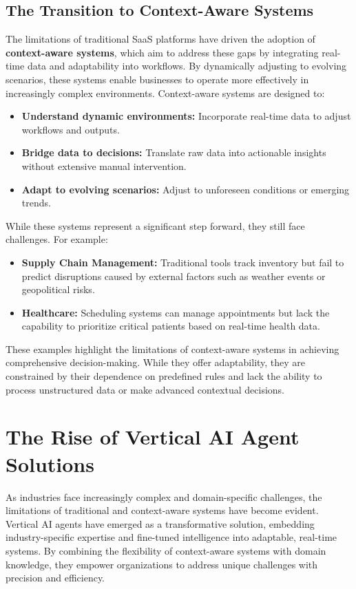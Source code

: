 \documentclass[12pt]{article}
\begin{document}
\subsection{The Transition to Context-Aware Systems}
The limitations of traditional SaaS platforms have driven the adoption of \textbf{context-aware systems}, which aim to address these gaps by integrating real-time data and adaptability into workflows. By dynamically adjusting to evolving scenarios, these systems enable businesses to operate more effectively in increasingly complex environments. Context-aware systems are designed to:
\begin{itemize}
    \item \textbf{Understand dynamic environments:} Incorporate real-time data to adjust workflows and outputs.
    \item \textbf{Bridge data to decisions:} Translate raw data into actionable insights without extensive manual intervention.
    \item \textbf{Adapt to evolving scenarios:} Adjust to unforeseen conditions or emerging trends.
\end{itemize}

While these systems represent a significant step forward, they still face challenges. For example:
\begin{itemize}
    \item \textbf{Supply Chain Management:} Traditional tools track inventory but fail to predict disruptions caused by external factors such as weather events or geopolitical risks.
    \item \textbf{Healthcare:} Scheduling systems can manage appointments but lack the capability to prioritize critical patients based on real-time health data.
\end{itemize}

These examples highlight the limitations of context-aware systems in achieving comprehensive decision-making. While they offer adaptability, they are constrained by their dependence on predefined rules and lack the ability to process unstructured data or make advanced contextual decisions.

\section{The Rise of Vertical AI Agent Solutions}

As industries face increasingly complex and domain-specific challenges, the limitations of traditional and context-aware systems have become evident. Vertical AI agents have emerged as a transformative solution, embedding industry-specific expertise and fine-tuned intelligence into adaptable, real-time systems. By combining the flexibility of context-aware systems with domain knowledge, they empower organizations to address unique challenges with precision and efficiency.
\end{document}
